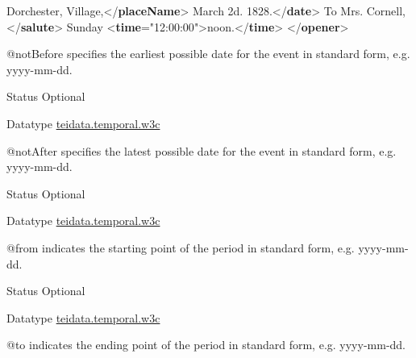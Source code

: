 \begin{reflist}
\begin{sansreflist}
\begin{reflist}
\hspace*{1em}Dorchester, Village,{</\textbf{placeName}>}\mbox{}\newline 
\hspace*{1em}March 2d. 1828.{</\textbf{date}>}\mbox{}\newline 
{}\mbox{}\newline 
{}To\mbox{}\newline 
\hspace*{1em}\hspace*{1em} Mrs. Cornell,{</\textbf{salute}>} Sunday {<\textbf{time}\hspace*{1em}{when}="{12:00:00}">}noon.{</\textbf{time}>}\mbox{}\newline 
{</\textbf{opener}>}
\end{reflist}  
    \item[@notBefore]
  specifies the earliest possible date for the event in standard form, e.g. yyyy-mm-dd.
\begin{reflist}
    \item[{Status}]
  Optional
    \item[{Datatype}]
  \hyperref[TEI.teidata.temporal.w3c]{teidata.temporal.w3c}
\end{reflist}  
    \item[@notAfter]
  specifies the latest possible date for the event in standard form, e.g. yyyy-mm-dd.
\begin{reflist}
    \item[{Status}]
  Optional
    \item[{Datatype}]
  \hyperref[TEI.teidata.temporal.w3c]{teidata.temporal.w3c}
\end{reflist}  
    \item[@from]
  indicates the starting point of the period in standard form, e.g. yyyy-mm-dd.
\begin{reflist}
    \item[{Status}]
  Optional
    \item[{Datatype}]
  \hyperref[TEI.teidata.temporal.w3c]{teidata.temporal.w3c}
\end{reflist}  
    \item[@to]
  indicates the ending point of the period in standard form, e.g. yyyy-mm-dd.

\end{sansreflist}
\end{reflist}

